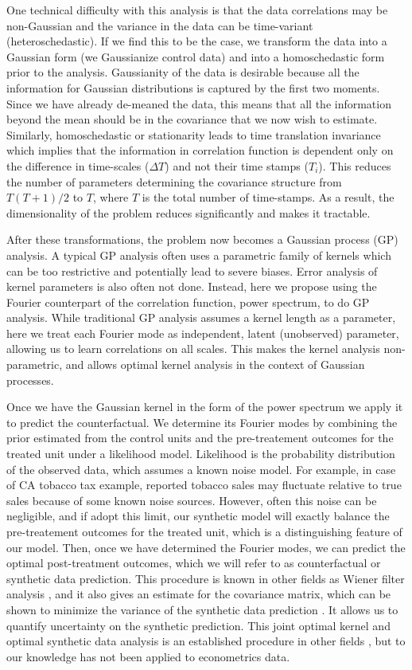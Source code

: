 \documentclass{article}
\begin{document}
One technical difficulty with this analysis is that the data correlations may be non-Gaussian and the variance in the data can be time-variant (heteroschedastic). If we find this to be the case, we transform the data into a Gaussian form (we Gaussianize control data) and into a homoschedastic form prior to the analysis. Gaussianity of the data is desirable because all the information for Gaussian distributions is captured by the first two moments. Since we have already de-meaned the data, this means that all the information beyond the mean should be in the covariance that we now wish to estimate. Similarly, homoschedastic or stationarity leads to time translation invariance which implies that the information in correlation function is dependent only on the difference in time-scales ($\Delta T$) and not their time stamps ($T_i$). This reduces the number of parameters determining the covariance structure from $T(T+1)/2$ to $T$, where $T$ is the total number of time-stamps. As a result, the dimensionality of the problem reduces significantly and makes it tractable. 

After these transformations, the problem now becomes a Gaussian process (GP) analysis. A typical GP analysis often uses a parametric family of kernels which can be 
too restrictive and potentially lead to severe biases. Error analysis of kernel parameters is also often not done. Instead, here we propose using the Fourier counterpart of the correlation function, power spectrum, to do GP analysis. While traditional GP analysis assumes a kernel length as a parameter, here we treat each Fourier mode as independent, latent (unobserved) parameter, allowing us to learn correlations on all scales. 
This makes the kernel analysis non-parametric, and allows optimal kernel analysis in the context of Gaussian processes. 

Once we have the Gaussian kernel in the form of the 
power spectrum we apply it to predict the 
counterfactual. 
We determine its Fourier modes by combining the prior estimated from the control units and the pre-treatement outcomes for the treated unit under a likelihood model. Likelihood is the probability distribution of the observed data, which assumes a known noise model. For example, in case of CA tobacco tax example, reported tobacco sales may fluctuate relative to true sales because of some known noise sources. However, often this
noise can be negligible, and if adopt this limit, our synthetic model will exactly balance the pre-treatement outcomes for the treated unit, which is a distinguishing feature of our model. Then, once we have determined the Fourier modes, we can predict the optimal post-treatment outcomes, which we will refer to as counterfactual or synthetic data prediction. This procedure is known in other 
fields as Wiener filter analysis \cite{wiener64}, and it also gives an estimate for the covariance matrix, which can be shown to minimize the variance of the synthetic data prediction \cite{rybicki92}. It allows us to quantify uncertainty on the synthetic prediction. This joint optimal kernel and optimal synthetic data 
analysis is an established procedure in other fields \cite{Seljak97}, 
but to our knowledge has not been applied to econometrics data. 
\end{document}
